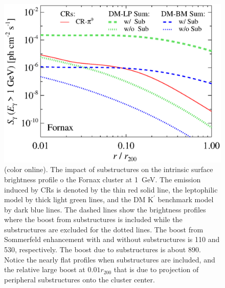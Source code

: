 \documentclass[10pt,aps,pra,reprint,amsmath,amsfonts,amssymb,showpacs,nofootinbib,floatfix]{revtex4-1}
\newcommand{\rmn}{\mathrm}
\newcommand{\Kp}{\rmn{K}^\prime}
\newcommand{\colo}{(color online). }
\newcommand{\rvir}{r_{200}}
\begin{document}
\begin{figure}%
 \includegraphics[width=0.99\columnwidth]{figures/SB.resolved.v14.1GeV.SF700.noSuB.vs.SubMass.elmu.bw.eps}
 \caption{\colo The impact of substructures on the
   intrinsic surface brightness profile o the Fornax cluster at
   1~GeV. The emission induced by CRs is denoted by the thin red solid
   line, the leptophilic model by thick light green lines, and the DM
   $\Kp$ benchmark model by dark blue lines. The dashed lines show the
   brightness profiles where the boost from substructures is included
   while the substructures are excluded for the dotted lines. The
   boost from Sommerfeld enhancement with and without substructures is
   110 and 530, respectively. The boost due to substructures is about
   890. Notice the nearly flat profiles when substructures are
   included, and the relative large boost at $0.01\rvir$ that is due
   to projection of peripheral substructures onto the cluster center.}
 \label{fig:SB_sub}
\end{figure}
\end{document}
